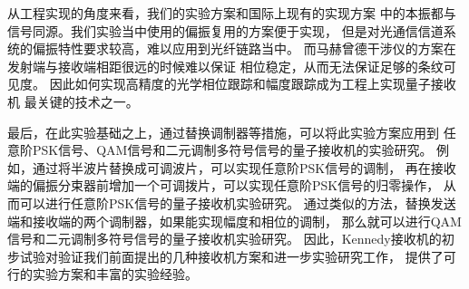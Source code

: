 从工程实现的角度来看，我们的实验方案和国际上现有的实现方案
中的本振都与信号同源\cite{wittmann2008demonstration,wittmann2010demonstration,tsujino2010sub,
tsujino2011quantum,becerra2011m,chen2012optical,muller2012quadrature,becerra2013experimental,
becerra2015photon}。我们实验当中使用的偏振复用的方案便于实现，
但是对光通信信道系统的偏振特性要求较高，难以应用到光纤链路当中。
而马赫曾德干涉仪的方案在发射端与接收端相距很远的时候难以保证
相位稳定，从而无法保证足够的条纹可见度。
因此如何实现高精度的光学相位跟踪和幅度跟踪成为工程上实现量子接收机
最关键的技术之一。

最后，在此实验基础之上，通过替换调制器等措施，可以将此实验方案应用到
任意阶PSK信号、QAM信号和二元调制多符号信号的量子接收机的实验研究。
例如，通过将半波片替换成可调波片，可以实现任意阶PSK信号的调制，
再在接收端的偏振分束器前增加一个可调拨片，可以实现任意阶PSK信号的归零操作，
从而可以进行任意阶PSK信号的量子接收机实验研究。
通过类似的方法，替换发送端和接收端的两个调制器，如果能实现幅度和相位的调制，
那么就可以进行QAM信号和二元调制多符号信号的量子接收机实验研究。
因此，Kennedy接收机的初步试验对验证我们前面提出的几种接收机方案和进一步实验研究工作，
提供了可行的实验方案和丰富的实验经验。



